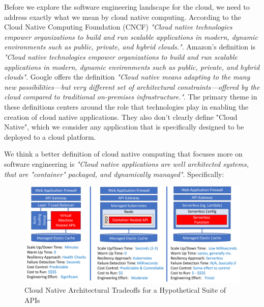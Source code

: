 \documentclass[conference]{IEEEconf}
\begin{document}
Before we explore the software engineering landscape for the cloud, we need to address exactly what we mean by cloud native computing.  According to the Cloud Native Computing Foundation (CNCF)\cite{CNCFHome}  \textit{"Cloud native technologies empower organizations to build and run scalable applications in modern, dynamic environments such as public, private, and hybrid clouds."}.  Amazon's definition is \textit{"Cloud native technologies empower organizations to build and run scalable applications in modern, dynamic environments such as public, private, and hybrid clouds"}. Google offers the definition \textit{"Cloud native means adapting to the many new possibilities—but very different set of architectural constraints—offered by the cloud compared to traditional on-premises infrastructure."}.  The primary theme in these definitions centers around the role that technologies play in enabling the creation of cloud native applications.  They also don't clearly define "Cloud Native", which we consider any application that is specifically designed to be deployed to a cloud platform. 

We think a better definition of cloud native computing that focuses more on  software engineering is \textit{"Cloud native applications are well architected systems, that are "container" packaged, and dynamically managed"}. Specifically:

\begin{figure}[t]
	\includegraphics[width=\textwidth]{images/APIPackageTradoffs}	
	\caption{Cloud Native Architectural Tradeoffs for a Hypothetical Suite of APIs}
	\label{fig:CloudQATradeoffs}
\end{figure}
\end{document}

